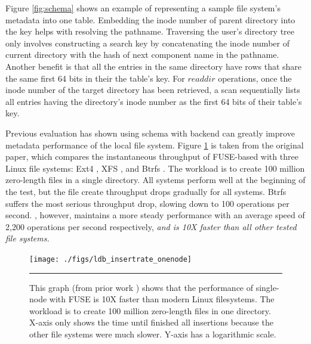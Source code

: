 Figure \ref{fig:schema} shows an example of representing
a sample file system's metadata into one table.
Embedding the inode number of parent directory into the key
helps with resolving the pathname.
Traversing the user's directory tree
only involves constructing a search key by concatenating the inode
number of current directory with the hash of
next component name in the pathname.
Another benefit is that all the entries in the same directory have rows that
share the same first 64 bits in their the table's key.
For $readdir$ operations, once the inode number
of the target directory has been retrieved,
a scan sequentially lists all entries having
the directory's inode number as the first 64 bits of their table's key.

Previous evaluation \cite{TableFS} has shown using \tfs schema with \ldb backend
can greatly improve metadata performance of the local file system.
Figure \ref{graph:ldb-singlenode} is taken from the original \tfs paper,
which compares the instantaneous throughput of FUSE-based \tfs
with three Linux file systems: Ext4 \cite{Ext4}, XFS \cite{XFS}, and
Btrfs \cite{BTRFS}.
The workload is to create 100 million zero-length files in a single directory.
All systems perform well at the beginning of the test, but the file create
throughput drops gradually for all systems.
Btrfs suffers the most serious throughput drop, slowing down to 100 operations
per second.
\tfs, however, maintains a more steady performance
with an average speed of 2,200 operations per second respectively,
\textit{and is 10X faster than all other tested file systems.}

\begin{figure}[t]  %
\centerline{\texttt{[image: ./figs/ldb\_insertrate\_onenode]}}
\vspace{10pt}
\caption{\textsf{\footnotesize
This graph (from prior work \cite{TableFS}) shows
that the performance of single-node \tfs with FUSE is 10X faster than modern Linux
filesystems. The workload is to create 100 million zero-length files in one directory.
X-axis only shows the time until \tfs finished all insertions because the other
file systems were much slower. Y-axis has a logarithmic scale.}
}
\hrule 
\label{graph:ldb-singlenode}
\end{figure}       %
